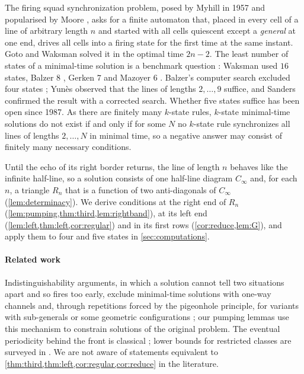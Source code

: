 \documentclass[3p]{elsarticle}
\theoremstyle{definition}
\begin{document}
The firing squad synchronization problem, posed by Myhill in 1957 and
popularised by Moore \cite{Moore64}, asks for a finite automaton that, placed
in every cell of a line of arbitrary length $n$ and started with all cells
quiescent except a \emph{general} at one end, drives all cells into a firing
state for the first time at the same instant. Goto \cite{Goto62} and Waksman
\cite{Waksman66} solved it in the optimal time $2n-2$. The least number of
states of a minimal-time solution is a benchmark question \cite{Correa17}:
Waksman used $16$ states, Balzer $8$ \cite{Balzer67}, Gerken $7$
\cite{Gerken87} and Mazoyer $6$ \cite{Mazoyer87}. Balzer's computer search
excluded four states \cite{Balzer67}; Yun\`es \cite{Yunes93} observed that the
lines of lengths $2,\dots,9$ suffice, and Sanders \cite{Sanders94} confirmed
the result with a corrected search. Whether five states suffice has been open
since 1987. As there are finitely many $k$-state rules, $k$-state minimal-time
solutions do not exist if and only if for some $N$ no $k$-state rule
synchronizes all lines of lengths $2,\dots,N$ in minimal time, so a negative
answer may consist of finitely many necessary conditions.

Until the echo of its right border returns, the line of length $n$ behaves
like the infinite half-line, so a solution consists of one half-line diagram
$C_\infty$ and, for each $n$, a triangle $R_n$ that is a function of two
anti-diagonals of $C_\infty$ (\cref{lem:determinacy}). We derive conditions at
the right end of $R_n$ (\cref{lem:pumping,thm:third,lem:rightband}), at its
left end (\cref{lem:left,thm:left,cor:regular}) and in its first rows
(\cref{cor:reduce,lem:G}), and apply them to four and five states in
\cref{sec:computations}.

\paragraph{Related work} Indistinguishability arguments, in which a solution
cannot tell two situations apart and so fires too early, exclude minimal-time
solutions with one-way channels \cite[Prop.~2]{Mazoyer96} and, through
repetitions forced by the pigeonhole principle, for variants with sub-generals
or some geometric configurations \cite{YamashitaEtAl14,Kobayashi19}; our
pumping lemmas use this mechanism to constrain solutions of the original
problem. The eventual periodicity behind the front is classical
\cite{MazoyerTerrier94,MazoyerTerrier99}; lower bounds for restricted classes
are surveyed in \cite{Correa17}. We are not aware of statements equivalent to
\cref{thm:third,thm:left,cor:regular,cor:reduce} in the literature.
\end{document}
